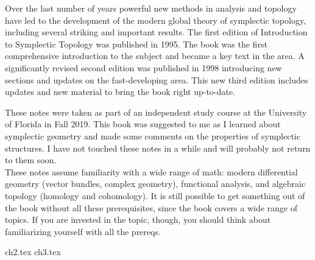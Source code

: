 \documentclass{../booknotes}
\begin{document}
\maketitle

\begin{pubdescrip}
	\indent \indent	Over the last number of years powerful new methods in analysis and topology have led to the development of the modern global theory of symplectic topology, including several striking and important results. The first edition of Introduction to Symplectic Topology was published in 1995. The book was the first comprehensive introduction to the subject and became a key text in the area. A significantly revised second edition was published in 1998 introducing new sections and updates on the fast-developing area. This new third edition includes updates and new material to bring the book right up-to-date.
\end{pubdescrip}

\begin{transcribernote}
	\indent These notes were taken as part of an independent study course at the University of Florida in Fall 2019. This book was suggested to me as I learned about symplectic geometry and made some comments on the properties of symplectic structures. I have not touched these notes in a while and will probably not return to them soon. \\
	\indent These notes assume familiarity with a wide range of math: modern differential geometry (vector bundles, complex geometry), functional analysis, and algebraic topology (homology and cohomology). It is still possible to get something out of the book without all these prerequisites, since the book covers a wide range of topics. If you are invested in the topic, though, you should think about familiarizing yourself with all the prereqs.
\end{transcribernote}

\tableofcontents

{ch2.tex}
{ch3.tex}
\end{document}
